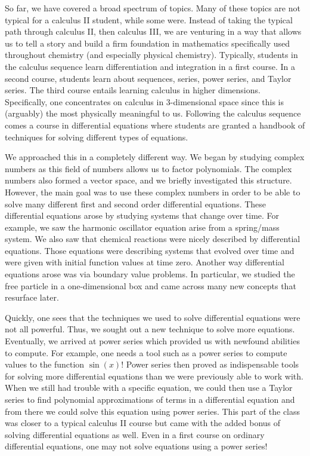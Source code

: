 So far, we have covered a broad spectrum of topics. Many of these topics are not typical for a calculus II student, while some were.  Instead of taking the typical path through calculus II, then calculus III, we are venturing in a way that allows us to tell a story and build a firm foundation in mathematics specifically used throughout chemistry (and especially physical chemistry).  Typically, students in the calculus sequence learn differentiation and integration in a first course.  In a second course, students learn about sequences, series, power series, and Taylor series.  The third course entails learning calculus in higher dimensions. Specifically, one concentrates on calculus in 3-dimensional space since this is (arguably) the most physically meaningful to us.  Following the calculus sequence comes a course in differential equations where students are granted a handbook of techniques for solving different types of equations.

We approached this in a completely different way.  We began by studying complex numbers as this field of numbers allows us to factor polynomials.  The complex numbers also formed a vector space, and we briefly investigated this structure.  However, the main goal was to use these complex numbers in order to be able to solve many different first and second order differential equations.  These differential equations arose by studying systems that change over time. For example, we saw the harmonic oscillator equation arise from a spring/mass system. We also saw that chemical reactions were nicely described by differential equations. Those equations were describing systems that evolved over time and were given with initial function values at time zero. Another way differential equations arose was via boundary value problems. In particular, we studied the free particle in a one-dimensional box and came across many new concepts that resurface later.

Quickly, one sees that the techniques we used to solve differential equations were not all powerful. Thus, we sought out a new technique to solve more equations.  Eventually, we arrived at power series which provided us with newfound abilities to compute.  For example, one needs a tool such as a power series to compute values to the function $\sin(x)$!  Power series then proved as indispensable tools for solving more differential equations than we were previously able to work with.  When we still had trouble with a specific equation, we could then use a Taylor series to find polynomial approximations of terms in a differential equation and from there we could solve this equation using power series.  This part of the class was closer to a typical calculus II course but came with the added bonus of solving differential equations as well.  Even in a first course on ordinary differential equations, one may not solve equations using a power series! 

